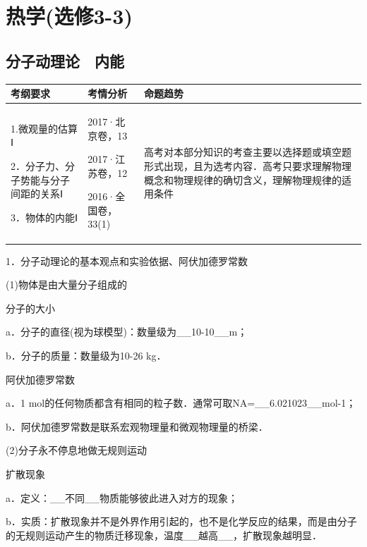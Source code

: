 \chapter{热学(选修3-3)}
\section{分子动理论　内能}


\begin{longtable}[]{@{}lll@{}}
\toprule
考纲要求 & 考情分析 & 命题趋势\tabularnewline
\midrule
\endhead
\begin{minipage}[t]{0.30\columnwidth}\raggedright
1.微观量的估算Ⅰ

2．分子力、分子势能与分子间距的关系Ⅰ

3．物体的内能Ⅰ\strut
\end{minipage} & \begin{minipage}[t]{0.30\columnwidth}\raggedright
2017·北京卷，13

2017·江苏卷，12

2016·全国卷\uppercase\expandafter{\romannumeral3}，33(1)\strut
\end{minipage} & \begin{minipage}[t]{0.30\columnwidth}\raggedright
高考对本部分知识的考查主要以选择题或填空题形式出现，且为选考内容．高考只要求理解物理概念和物理规律的确切含义，理解物理规律的适用条件\strut
\end{minipage}\tabularnewline
\bottomrule
\end{longtable}



1．分子动理论的基本观点和实验依据、阿伏加德罗常数

(1)物体是由大量分子组成的

分子的大小

a．分子的直径(视为球模型)：数量级为\_\_10-10\_\_m；

b．分子的质量：数量级为10-26 kg．

阿伏加德罗常数

a．1
mol的任何物质都含有相同的粒子数．通常可取NA=\_\_6.021023\_\_mol-1；

b．阿伏加德罗常数是联系宏观物理量和微观物理量的桥梁．

(2)分子永不停息地做无规则运动

扩散现象

a．定义：\_\_不同\_\_物质能够彼此进入对方的现象；

b．实质：扩散现象并不是外界作用引起的，也不是化学反应的结果，而是由分子的无规则运动产生的物质迁移现象，温度\_\_越高\_\_，扩散现象越明显．

